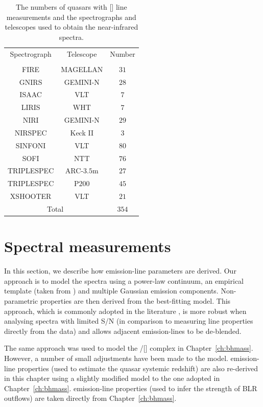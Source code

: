 \begin{table}
  \centering
  \footnotesize 
  \caption{The numbers of quasars with [] line measurements and the spectrographs and telescopes used to obtain the near-infrared spectra.}
  \label{tab:specnums_ch4}
    \begin{tabular}{ccc} 
    \hline
    Spectrograph & Telescope & Number \\
                 &           & \\
    \hline
    FIRE         & MAGELLAN  & $31$ \\
    GNIRS        & GEMINI-N  & $28$ \\
    ISAAC        & VLT       & $7$ \\
    LIRIS        & WHT       & $7$ \\
    NIRI         & GEMINI-N  & $29$ \\
    NIRSPEC      & Keck II   & $3$ \\
    SINFONI      & VLT       & $80$ \\
    SOFI         & NTT       & $76$ \\
    TRIPLESPEC   & ARC-$3.5$m  & $27$ \\
    TRIPLESPEC   & P$200$      & $45$ \\
    XSHOOTER     & VLT       & $21$ \\
    \hline
    \multicolumn{2}{c}{Total} & $354$ \\
    \hline
    \end{tabular}
\end{table} 

\section{Spectral measurements}

In this section, we describe how emission-line parameters are derived. 
Our approach is to model the spectra using a power-law continuum, an empirical  template (taken from \citealt{boroson92}) and multiple Gaussian emission components.
Non-parametric properties are then derived from the best-fitting model. 
This approach, which is commonly adopted in the literature \citep[e.g.][]{shen11,shen12,shen16a}, is more robust when analysing spectra with limited S/N (in comparison to measuring line properties directly from the data) and allows adjacent emission-lines to be de-blended.

The same approach was used to model the \hbns/[] complex in Chapter~\ref{ch:bhmass}. 
However, a number of small adjustments have been made to the model. 
\ha emission-line properties (used to estimate the quasar systemic redshift) are also re-derived in this chapter using a slightly modified model to the one adopted in Chapter~\ref{ch:bhmass}. 
 emission-line properties (used to infer the strength of BLR outflows) are taken directly from Chapter~\ref{ch:bhmass}. 

